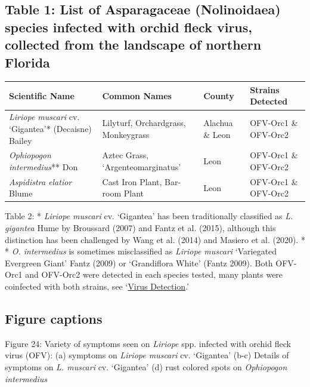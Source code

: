 \documentclass[12pt,final,CPage]{ufthesis}
\begin{document}
{  \hypertarget{table-1-list-of-asparagaceae-nolinoidaea-species-infected-with-orchid-fleck-virus-collected-from-the-landscape-of-northern-florida}{%
  \subsection{Table 1: List of Asparagaceae (Nolinoidaea) species infected with orchid fleck virus, collected from the landscape of northern Florida}\label{table-1-list-of-asparagaceae-nolinoidaea-species-infected-with-orchid-fleck-virus-collected-from-the-landscape-of-northern-florida}}
  \begin{longtable}[]{@{}
    >{\raggedright\arraybackslash}p{}
    >{\raggedright\arraybackslash}p{}
    >{\raggedright\arraybackslash}p{}
    >{\raggedright\arraybackslash}p{}@{}}
  \toprule
  Scientific Name & Common Names & County & Strains Detected \\
  \midrule
  \endhead
  \emph{Liriope muscari} cv. `Gigantea'* (Decaisne) Bailey & Lilyturf, Orchardgrass, Monkeygrass & Alachua \& Leon & OFV-Orc1 \& OFV-Orc2 \\
  \emph{Ophiopogon intermedius}** Don & Aztec Grass, `Argenteomarginatus' & Leon & OFV-Orc1 \& OFV-Orc2 \\
  \emph{Aspidistra elatior} Blume & Cast Iron Plant, Bar-room Plant & Leon & OFV-Orc1 \& OFV-Orc2 \\
  \bottomrule
  \end{longtable}
  Table 2: * \emph{Liriope muscari} cv. `Gigantea' has been traditionally classified as \emph{L. gigantea} Hume by Broussard (2007) and Fantz et al. (2015), although this distinction has been challenged by Wang et al. (2014) and Masiero et al. (2020). * * \emph{O. intermedius} is sometimes misclassified as \emph{Liriope muscari} `Variegated Evergreen Giant' Fantz (2009) or `Grandiflora White' (Fantz 2009). Both OFV-Orc1 and OFV-Orc2 were detected in each species tested, many plants were coinfected with both strains, see `\protect\hyperlink{virus-detection}{Virus Detection}.'

  \hypertarget{figure-captions}{%
  \subsection{Figure captions}\label{figure-captions}}

  Figure 24: Variety of symptoms seen on \emph{Liriope} spp. infected with orchid fleck virus (OFV): (a) symptoms on \emph{Liriope muscari} cv. `Gigantea' (b-c) Details of symptoms on \emph{L. muscari} cv. `Gigantea' (d) rust colored spots on \emph{Ophiopogon intermedius}

}
\end{document}
